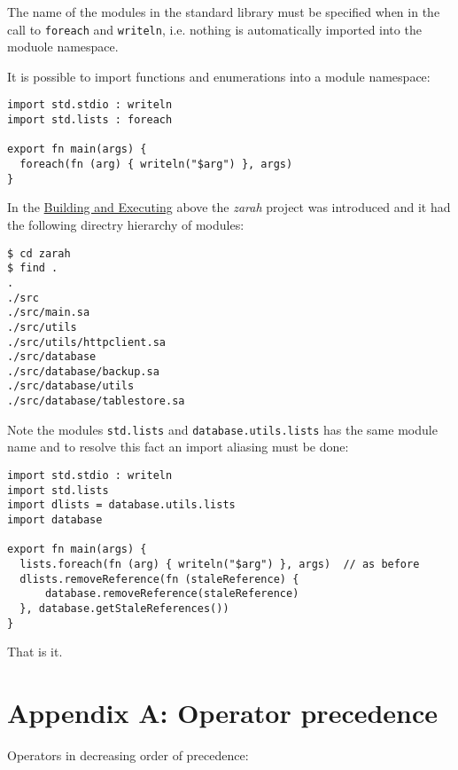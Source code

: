 The name of the modules in the standard library must be specified when
in the call to \texttt{foreach} and \texttt{writeln}, i.e. nothing is
automatically imported into the moduole namespace.

It is possible to import functions and enumerations into a module
namespace:

\begin{verbatim}
import std.stdio : writeln
import std.lists : foreach

export fn main(args) {
  foreach(fn (arg) { writeln("$arg") }, args)
}
\end{verbatim}

In the \href{building-and-executing}{Building and Executing} above the
\emph{zarah} project was introduced and it had the following directry
hierarchy of modules:

\begin{verbatim}
$ cd zarah
$ find .
.
./src
./src/main.sa
./src/utils
./src/utils/httpclient.sa
./src/database
./src/database/backup.sa
./src/database/utils
./src/database/tablestore.sa
\end{verbatim}

Note the modules \texttt{std.lists} and \texttt{database.utils.lists}
has the same module name and to resolve this fact an import aliasing
must be done:

\begin{verbatim}
import std.stdio : writeln
import std.lists
import dlists = database.utils.lists
import database

export fn main(args) {
  lists.foreach(fn (arg) { writeln("$arg") }, args)  // as before
  dlists.removeReference(fn (staleReference) {
      database.removeReference(staleReference)
  }, database.getStaleReferences())
}
\end{verbatim}

That is it.

\hypertarget{appendix-a-operator-precedence}{%
\section{Appendix A: Operator
precedence}\label{appendix-a-operator-precedence}}

Operators in decreasing order of precedence:

